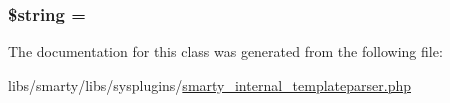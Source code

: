 \subsubsection[{\$string}]{\setlength{\rightskip}{0pt plus 5cm}\$string = \textquotesingle{}\textquotesingle{}}\label{class_t_p__yy_token_a05bc82187ba145848edd864852f4bd37}


The documentation for this class was generated from the following file\+:\begin{DoxyCompactItemize}
\item 
libs/smarty/libs/sysplugins/\hyperlink{smarty__internal__templateparser_8php}{smarty\+\_\+internal\+\_\+templateparser.\+php}\end{DoxyCompactItemize}
